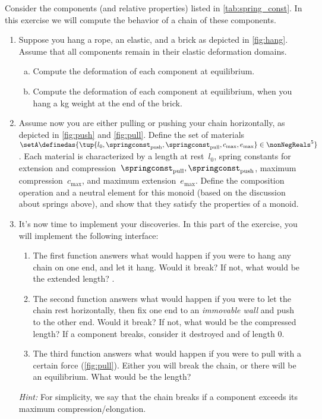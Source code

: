 \begin{gradedexercise}
  Consider the components (and relative properties) listed in \cref{tab:spring_const}.
  In this exercise we will compute the behavior of a chain of these components.
  \begin{enumerate}
    \item Suppose you hang a rope, an elastic, and a brick as depicted in \cref{fig:hang}. Assume that all components remain in their elastic deformation domains.
    \begin{enumerate}[(a)]
    \item Compute the deformation of each component at equilibrium.
    \item Compute the deformation of each component at equilibrium, when you hang a \unit[1]{kg} weight at the end of the brick.
\end{enumerate}
    \item Assume now you are either pulling or pushing your chain horizontally, as depicted in \cref{fig:push} and \cref{fig:pull}.
    Define the set of materials~$\setA\definedas \{ \tup{l_0, \springconst_\mathrm{push},\springconst_\mathrm{pull}, c_\mathrm{max}, e_\mathrm{max}} \in \nonNegReals^5\}$.
Each material is characterized by a length at rest~$l_0$, spring constants for extension and compression~$\springconst_\mathrm{pull}, \springconst_\mathrm{push}$, maximum compression~$c_\mathrm{max}$, and maximum extension~$e_\mathrm{max}$.
    Define the composition operation and a neutral element for this monoid (based on the discussion about springs above), and show that they satisfy the properties of a monoid.
    \item It's now time to implement your discoveries. In this part of the exercise, you will implement the following interface:

    \begin{enumerate}
      \item The first function answers what would happen if you were to hang any chain on one end, and let it hang. Would it break? If not, what would be the extended length? .
      \item The second function answers what would happen if you were to let the chain rest horizontally, then fix one end to an \emph{immovable wall} and push to the other end. Would it break? If not, what would be the compressed length?
    If a component breaks, consider it destroyed and of length 0.
    \item The third function answers what would happen if you were to pull with a certain force (\cref{fig:pull}). Either you will break the chain, or there will be an equilibrium. What would be the length?
    \end{enumerate}
    \emph{Hint:} For simplicity, we say that the chain breaks if a component exceeds its maximum compression/elongation.
  \end{enumerate}
\end{gradedexercise}

